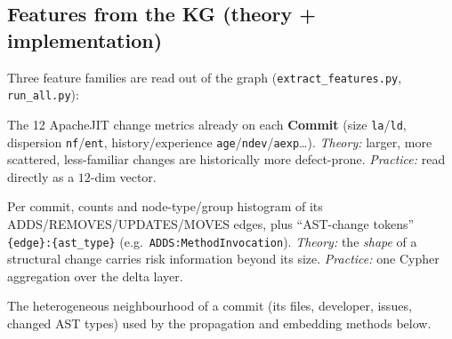 \documentclass[11pt,a4paper]{article}
\newcommand{\code}[1]{\texttt{#1}}
\newcommand{\node}[1]{\textcolor{kgblue}{\textbf{#1}}}
\newcommand{\edge}[1]{\textsc{#1}}
\begin{document}
	\subsection{Features from the KG (theory + implementation)}
	Three feature families are read out of the graph
	(\texttt{extract\_features.py}, \texttt{run\_all.py}):
	\begin{description}[nosep,leftmargin=1.4em]
		\item[Process metrics.] The 12 ApacheJIT change metrics already on each
		\node{Commit} (size \code{la}/\code{ld}, dispersion \code{nf}/\code{ent},
		history/experience \code{age}/\code{ndev}/\code{aexp}\ldots). \emph{Theory:}
		larger, more scattered, less-familiar changes are historically more
		defect-prone. \emph{Practice:} read directly as a $12$-dim vector.
		\item[Delta-graph features.] Per commit, counts and node-type/group histogram
		of its \edge{ADDS}/\edge{REMOVES}/\edge{UPDATES}/\edge{MOVES} edges, plus
		``AST-change tokens'' \code{\{edge\}:\{ast\_type\}}
		(e.g.\ \code{ADDS:MethodInvocation}). \emph{Theory:} the \emph{shape} of a
		structural change carries risk information beyond its size. \emph{Practice:}
		one Cypher aggregation over the delta layer.
		\item[Topology.] The heterogeneous neighbourhood of a commit (its files,
		developer, issues, changed AST types) used by the propagation and
		embedding methods below.
	\end{description}
	
\end{document}
